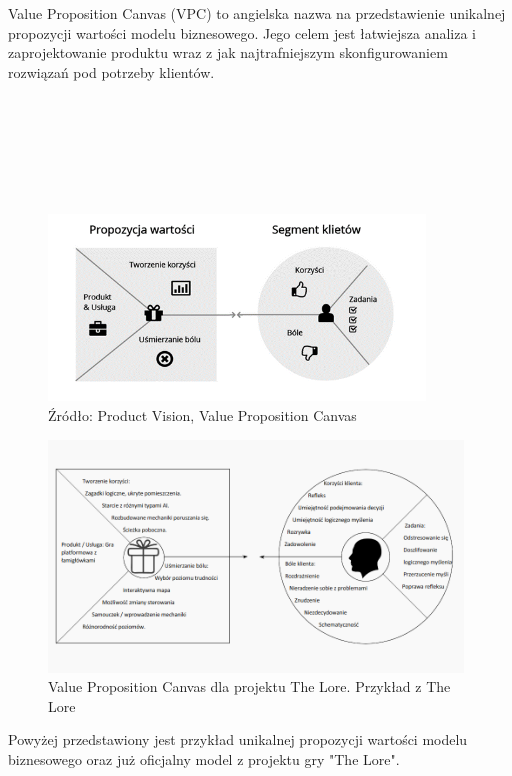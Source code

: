 \documentclass[oneside,polski,logo]{amuthesis}
\begin{document}
Value Proposition Canvas (VPC) to angielska nazwa na przedstawienie unikalnej propozycji wartości modelu biznesowego. Jego celem jest łatwiejsza analiza i zaprojektowanie  produktu wraz z jak najtrafniejszym skonfigurowaniem rozwiązań pod potrzeby klientów.\cite{VPC}\\ \\ \\ \\ \\ \\ \\

\begin{figure}[h]
	\centering
	\includegraphics[width=10cm]{images/hyps/VPC.png}
	\caption{Źródło: Product Vision, Value Proposition Canvas}
\end{figure}

\begin{figure}[h]
	\centering
	\includegraphics[width=11cm]{images/hyps/VPC-The Lore.png}
	\caption{Value Proposition Canvas dla projektu The Lore. Przykład z The Lore}
\end{figure}

Powyżej przedstawiony jest przykład unikalnej propozycji wartości modelu biznesowego oraz już oficjalny model z projektu gry "The Lore".\\ \\ \\ \\ \\ \\ \\ \\ \\ 
\end{document}
